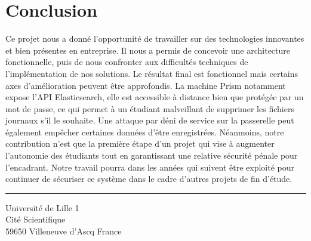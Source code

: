 \chapter*{Conclusion}
\label{sec:conclusion}

Ce projet nous a donné l'opportunité de travailler sur des technologies innovantes et bien présentes en entreprise. Il nous a permis de concevoir une architecture fonctionnelle, puis de nous confronter aux difficultés techniques de l'implémentation de nos solutions. Le résultat final est fonctionnel mais certains axes d'amélioration peuvent être approfondis. La machine Prism notamment expose l'API Elasticsearch, elle est accessible à distance bien que protégée par un mot de passe, ce qui permet à un étudiant malveillant de supprimer les fichiers journaux s'il le souhaite. Une attaque par déni de service sur la passerelle peut également empêcher certaines données d'être enregistrées. Néanmoins, notre contribution n'est que la première étape d'un projet qui vise à augmenter l'autonomie des étudiants tout en garantissant une relative sécurité pénale pour l'encadrant. Notre travail pourra dans les années qui suivent être exploité pour continuer de sécuriser ce système dans le cadre d'autres projets de fin d'étude. 

\appendix

\noindent\rule[2pt]{\textwidth}{0.5pt}
\begin{center}
  Université de Lille 1\\
  Cité Scientifique\\
  59650 Villeneuve d'Ascq France
\end{center}
\vspace*{\fill}
